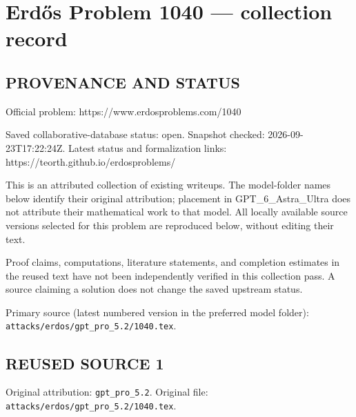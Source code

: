 \section*{Erd\H{o}s Problem 1040 --- collection record}

\subsection*{PROVENANCE AND STATUS}
Official problem: https://www.erdosproblems.com/1040

Saved collaborative-database status: open.
Snapshot checked: 2026-09-23T17:22:24Z.
Latest status and formalization links: https://teorth.github.io/erdosproblems/

This is an attributed collection of existing writeups. The model-folder names below identify their original attribution; placement in GPT\_6\_Astra\_Ultra does not attribute their mathematical work to that model. All locally available source versions selected for this problem are reproduced below, without editing their text.

Proof claims, computations, literature statements, and completion estimates in the reused text have not been independently verified in this collection pass. A source claiming a solution does not change the saved upstream status.

Primary source (latest numbered version in the preferred model folder): \texttt{attacks/erdos/gpt\_pro\_5.2/1040.tex}.

\subsection*{REUSED SOURCE 1}
Original attribution: \texttt{gpt\_pro\_5.2}.
Original file: \texttt{attacks/erdos/gpt\_pro\_5.2/1040.tex}.


